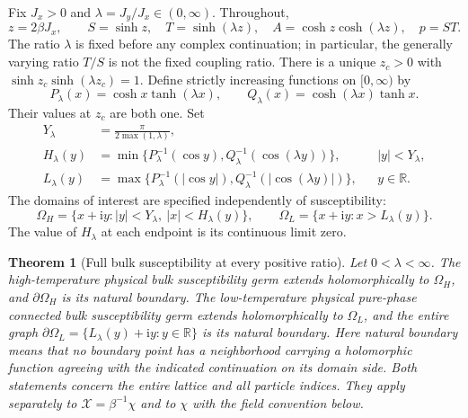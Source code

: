 \documentclass[11pt]{article}
\numberwithin{equation}{section}
\newtheorem{theorem}{Theorem}[section]
\theoremstyle{definition}
\newcommand{\R}{\mathbb R}
\newcommand{\ii}{\mathrm i}
\newcommand{\OH}{\Omega_H}
\newcommand{\OL}{\Omega_L}
\begin{document}
Fix $J_x>0$ and $\lambda=J_y/J_x\in(0,\infty)$. Throughout,
\begin{equation}\label{eq:variables}
 z=2\beta J_x,\qquad S=\sinh z,\quad T=\sinh(\lambda z),\quad
 A=\cosh z\cosh(\lambda z),\quad p=ST.
\end{equation}
The ratio $\lambda$ is fixed before any complex continuation; in particular,
the generally varying ratio $T/S$ is not the fixed coupling ratio.
There is a unique $z_c>0$ with $\sinh z_c\sinh(\lambda z_c)=1$.
Define strictly increasing functions on $[0,\infty)$ by
\begin{equation}\label{eq:physicalPQ}
 P_\lambda(x)=\cosh x\tanh(\lambda x),\qquad
 Q_\lambda(x)=\cosh(\lambda x)\tanh x.
\end{equation}
Their values at $z_c$ are both one. Set
\begin{align}
 Y_\lambda&=\frac{\pi}{2\max(1,\lambda)},\nonumber\\
 H_\lambda(y)&=\min\{P_\lambda^{-1}(\cos y),
                      Q_\lambda^{-1}(\cos(\lambda y))\},
                      &&|y|<Y_\lambda,\label{eq:Hdef}\\
 L_\lambda(y)&=\max\{P_\lambda^{-1}(|\cos y|),
                      Q_\lambda^{-1}(|\cos(\lambda y)|)\},
                      &&y\in\R.\label{eq:Ldef}
\end{align}
The domains of interest are specified independently of susceptibility:
\begin{equation}\label{eq:domains}
 \OH=\{x+\ii y:|y|<Y_\lambda,\ |x|<H_\lambda(y)\},\qquad
 \OL=\{x+\ii y:x>L_\lambda(y)\}.
\end{equation}
The value of $H_\lambda$ at each endpoint is its continuous limit zero.

\begin{theorem}[Full bulk susceptibility at every positive ratio]\label{thm:aniso}
Let $0<\lambda<\infty$. The high-temperature physical
bulk susceptibility germ extends holomorphically to $\OH$, and
$\partial\OH$ is its natural boundary. The low-temperature physical
pure-phase connected bulk susceptibility germ extends holomorphically to
$\OL$, and the entire graph $\partial\OL=\{L_\lambda(y)+\ii y:y\in\R\}$
is its natural boundary. Here natural boundary means that no boundary
point has a neighborhood carrying a holomorphic function agreeing with
the indicated continuation on its domain side. Both statements concern
the entire lattice and all particle indices. They apply separately to
$\mathcal X=\beta^{-1}\chi$ and to $\chi$ with the field convention below.
\end{theorem}
\end{document}
